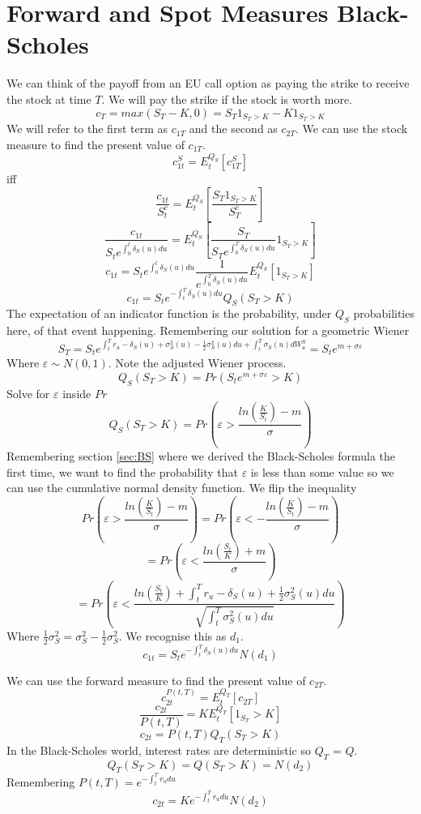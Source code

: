 
\section{Forward and Spot Measures Black-Scholes}

We can think of the payoff from an EU call option as paying the strike to
receive the stock at time $T$. We will pay the strike if the stock is worth
more.
\[c_T=max(S_T-K,0)=S_T1_{S_T>K}-K1_{S_T>K}\]
We will refer to the first term as $c_{1T}$ and the second as $c_{2T}$.
We can use the stock measure to find the present value of $c_{1T}$.
\[c_{1t}^S=E_t^{Q_S}[c_{1T}^S]\]
iff
\[\frac{c_{1t}}{S_t^c}=E_t^{Q_S}\left[\frac{S_T1_{S_T>K}}{S_T^c}\right]\]
\[
  \frac{c_{1t}}{S_te^{\int_0^t\delta_S(u)du}}=
  E_t^{Q_S}\left[\frac{S_T}{S_Te^{\int_0^T\delta_S(u)du}}1_{S_T>K}\right]
\]
\[
  c_{1t}=S_te^{\int_0^t\delta_S(u)du}\frac{1}{e^{\int_0^T\delta_S(u)du}}
  E_t^{Q_S}\left[ 1_{S_T>K}\right]
\]
\[c_{1t}=S_te^{-\int_t^T\delta_S(u)du}Q_S(S_T>K)\]
The expectation of an indicator function is the probability, under $Q_S$
probabilities here, of that event happening.
Remembering our solution for a geometric Wiener
\[
  S_T=S_te^{\int_t^Tr_u-\delta_S(u)+\sigma_S^2(u)-\frac{1}{2}\sigma_S^2(u)du+
  \int_t^T\sigma_S(u)dW_u^S}=S_te^{m+\sigma\varepsilon}
\]
Where $\varepsilon\sim N(0,1)$.
Note the adjusted Wiener process.
\[Q_S(S_T>K)=Pr(S_te^{m+\sigma\varepsilon}>K)\]
Solve for $\varepsilon$ inside $Pr$
\[
  Q_S(S_T>K)=
  Pr\left(\varepsilon>\frac{ln\left(\frac{K}{S_t}\right) -m}{\sigma}\right)
\]
Remembering section \ref{sec:BS} where we derived the Black-Scholes formula the
first time, we want to find the probability that $\varepsilon$ is less than
some value so we can use the cumulative normal density function. We flip the
inequality
\[
  Pr\left(\varepsilon>\frac{ln\left(\frac{K}{S_t}\right) -m}{\sigma}\right)=
  Pr\left(\varepsilon<-\frac{ln\left(\frac{K}{S_t}\right) -m}{\sigma}\right)
\]
\[=Pr\left(\varepsilon<\frac{ln\left(\frac{S_t}{K}\right) +m}{\sigma}\right)\]
\[
  =Pr\left(\varepsilon<\frac{ln\left(\frac{S_t}{K}\right) +
  \int_t^Tr_u-\delta_S(u)+\frac{1}{2}\sigma_S^2(u)du}
  {\sqrt{\int_t^T\sigma_S^2(u)du}}\right)
\]
Where $\frac{1}{2}\sigma_S^2=\sigma_S^2-\frac{1}{2}\sigma_S^2$. We
recognise this as $d_1$.
\begin{equation} \label{c1t}
  c_{1t}=S_te^{-\int_t^T\delta_S(u)du}N(d_1)
\end{equation}

We can use the forward measure to find the present value of $c_{2T}$.
\[c_{2t}^{P(t,T)}=E_t^{Q_T}[c_{2T}]\]
\[\frac{c_{2t}}{P(t,T)}=KE_t^{Q_T}[1_{S_T}>K]\]
\[c_{2t}=P(t,T)Q_T(S_T>K)\]
In the Black-Scholes world, interest rates are deterministic so $Q_T$ = $Q$.
\[Q_T(S_T>K)=Q(S_T>K)=N(d_2)\]
Remembering $P(t,T)=e^{-\int_t^Tr_udu}$
\begin{equation} \label{c2t}
  c_{2t}=Ke^{-\int_t^Tr_udu}N(d_2)
\end{equation}
